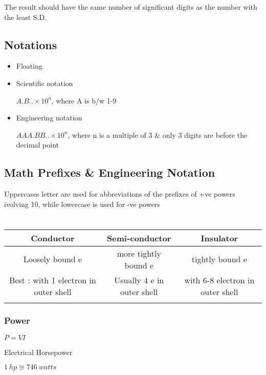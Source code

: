 \documentclass[openany]{book}
\begin{document}
    The result should have the same number of significant digits as the number with the least S.D.

\section{Notations}

\begin{itemize}
    \item Floating
    \item Scientific notation

    \(A.B.. \times 10^n \), where A is b/w 1-9
    \item Engineering notation
    
    \( AAA.BB.. \times 10^n \), where n is a multiple of 3 \& only 3 digits are before the decimal point
\end{itemize}

\section{Math Prefixes \& Engineering Notation}

Uppercases letter are used for abbreviations of the prefixes of +ve powers ivolving 10, while lowercase is used for -ve powers 

\chapter{}

\begin{tabular}{c c c}
    Conductor & Semi-conductor & Insulator \\
    \hline
    Loosely bound e&
        more tightly bound e&
        tightly bound e\\
    
    Best :
    with 1 electron in outer shell &
    Usually 4 e in outer shell&
    with 6-8 electron in outer shell\\
    \\
\end{tabular}

\subsection{Power}

\(P=VI\)

Electrical Horsepower

\(1\ hp \cong 746\ watts \)
\end{document}
